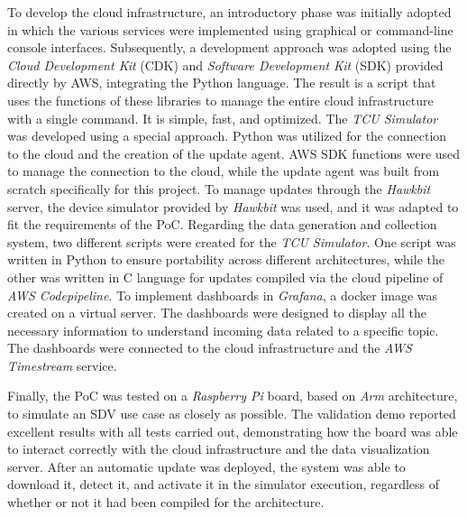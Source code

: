 \documentclass[10pt,a4paper,roman, twocolumn]{article}
\begin{document}
To develop the cloud infrastructure, an introductory phase was initially adopted in which the various services were implemented using graphical or command-line console interfaces. Subsequently, a development approach was adopted using the \textit{Cloud Development Kit} (CDK) and \textit{Software Development Kit} (SDK) provided directly by AWS, integrating the Python language. The result is a script that uses the functions of these libraries to manage the entire cloud infrastructure with a single command. It is simple, fast, and optimized.
The \textit{TCU Simulator} was developed using a special approach. Python was utilized for the connection to the cloud and the creation of the update agent. AWS SDK functions were used to manage the connection to the cloud, while the update agent was built from scratch specifically for this project. To manage updates through the \textit{Hawkbit} server, the device simulator provided by \textit{Hawkbit} was used, and it was adapted to fit the requirements of the PoC. Regarding the data generation and collection system, two different scripts were created for the \textit{TCU Simulator}. One script was written in Python to ensure portability across different architectures, while the other was written in C language for updates compiled via the cloud pipeline of \textit{AWS Codepipeline}.
To implement dashboards in \textit{Grafana}, a docker image was created on a virtual server. The dashboards were designed to display all the necessary information to understand incoming data related to a specific topic. The dashboards were connected to the cloud infrastructure and the \textit{AWS Timestream} service.

Finally, the PoC was tested on a \textit{Raspberry Pi} board, based on \textit{Arm} architecture, to simulate an SDV use case as closely as possible. The validation demo reported excellent results with all tests carried out, demonstrating how the board was able to interact correctly with the cloud infrastructure and the data visualization server. After an automatic update was deployed, the system was able to download it, detect it, and activate it in the simulator execution, regardless of whether or not it had been compiled for the architecture.
\end{document}
